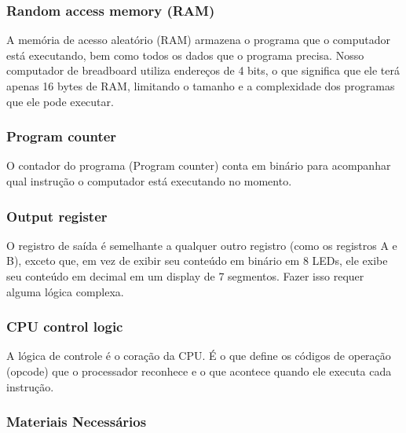 \subsubsection{Random access memory (RAM)}
A memória de acesso aleatório (RAM) armazena o programa que o computador está executando, bem como todos os dados que o programa precisa. Nosso computador de breadboard utiliza endereços de 4 bits, o que significa que ele terá apenas 16 bytes de RAM, limitando o tamanho e a complexidade dos programas que ele pode executar.

\subsubsection{Program counter}
O contador do programa (Program counter) conta em binário para acompanhar qual instrução o computador está executando no momento.

\subsubsection{Output register}
O registro de saída é semelhante a qualquer outro registro (como os registros A e B), exceto que, em vez de exibir seu conteúdo em binário em 8 LEDs, ele exibe seu conteúdo em decimal em um display de 7 segmentos. Fazer isso requer alguma lógica complexa.

\subsubsection{CPU control logic}
A lógica de controle é o coração da CPU. É o que define os códigos de operação (opcode) que o processador reconhece e o que acontece quando ele executa cada instrução.

\subsubsection{Materiais Necessários}

\newpage